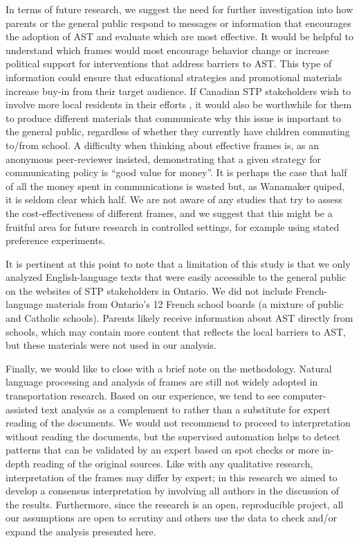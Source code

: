 \documentclass[preprint, 3p,
authoryear]{elsarticle} %
\begin{document}
In terms of future research, we suggest the need for further
investigation into how parents or the general public respond to messages
or information that encourages the adoption of AST and evaluate which
are most effective. It would be helpful to understand which frames would
most encourage behavior change or increase political support for
interventions that address barriers to AST. This type of information
could ensure that educational strategies and promotional materials
increase buy-in from their target audience. If Canadian STP stakeholders
wish to involve more local residents in their efforts
\citep{buttazzoniSupportingActiveSchool2018}, it would also be
worthwhile for them to produce different materials that communicate why
this issue is important to the general public, regardless of whether
they currently have children commuting to/from school. A difficulty when
thinking about effective frames is, as an anonymous peer-reviewer
insisted, demonstrating that a given strategy for communicating policy
is ``good value for money''. It is perhaps the case that half of all the
money spent in communications is wasted but, as Wanamaker quiped, it is
seldom clear which half. We are not aware of any studies that try to
assess the cost-effectiveness of different frames, and we suggest that
this might be a fruitful area for future research in controlled
settings, for example using stated preference experiments.

It is pertinent at this point to note that a limitation of this study is
that we only analyzed English-language texts that were easily accessible
to the general public on the websites of STP stakeholders in Ontario. We
did not include French-language materials from Ontario's 12 French
school boards (a mixture of public and Catholic schools). Parents likely
receive information about AST directly from schools, which may contain
more content that reflects the local barriers to AST, but these
materials were not used in our analysis.

Finally, we would like to close with a brief note on the methodology.
Natural language processing and analysis of frames are still not widely
adopted in transportation research. Based on our experience, we tend to
see computer-assisted text analysis as a complement to rather than a
substitute for expert reading of the documents. We would not recommend
to proceed to interpretation without reading the documents, but the
supervised automation helps to detect patterns that can be validated by
an expert based on spot checks or more in-depth reading of the original
sources. Like with any qualitative research, interpretation of the
frames may differ by expert; in this research we aimed to develop a
consensus interpretation by involving all authors in the discussion of
the results. Furthermore, since the research is an open, reproducible
project, all our assumptions are open to scrutiny and others use the
data to check and/or expand the analysis presented here.

\renewcommand\refname{References}

\end{document}
